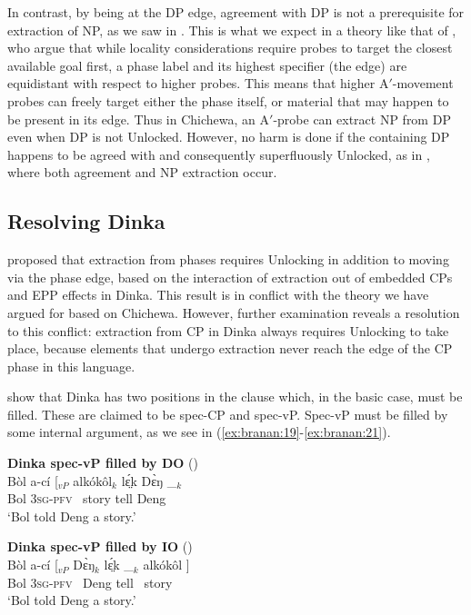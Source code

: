 \documentclass[output=paper,colorlinks,citecolor=brown]{langscibook}
\begin{document}
In contrast, by being at the DP edge, agreement with DP is not a prerequisite for extraction of NP, as we saw in . This is what we expect in a theory like that of \citet{RackowskiRichards2005}, who argue that while locality considerations require probes to target the closest available goal first, a phase label and its highest specifier (the edge) are equidistant with respect to higher probes. This means that higher A$'$-movement probes can freely target either the phase itself, or material that may happen to be present in its edge. Thus in Chichewa, an A$'$-probe can extract NP from DP even when DP is not Unlocked. However, no harm is done if the containing DP happens to be agreed with and consequently superfluously Unlocked, as in , where both agreement and NP extraction occur.

\subsection{Resolving Dinka}\label{sec:branan:5.2}

\citet{VanUrkRichards2015} proposed that extraction from phases requires Unlocking in addition to moving via the phase edge, based on the interaction of extraction out of embedded CPs and EPP effects in Dinka. This result is in conflict with the theory we have argued for based on Chichewa. However, further examination reveals a resolution to this conflict: extraction from CP in Dinka always requires Unlocking to take place, because elements that undergo extraction never reach the edge of the CP phase in this language.

\citeauthor{VanUrkRichards2015} show that Dinka has two positions in the clause which, in the basic case, must be filled. These are claimed to be spec-CP and spec-vP. Spec-vP must be filled by some internal argument, as we see in (\ref{ex:branan:19}-\ref{ex:branan:21}).

\ea%
    \label{ex:branan:19}
    \textbf{Dinka spec-vP filled by DO} \hfill{(\citealt[ex. 33b]{VanUrkRichards2015})}\\
    \gll    B\`{o}l a-c\'{i} [$_{vP}$ alk\'{o}k\^{o}l$_{k}$  lɛ̤́k  D\`{ɛ}ŋ \_$_{k}$ \\
            Bol \textsc{3sg-pfv} \,  story tell Deng \\
    \glt    `Bol told Deng a story.'
\z

\ea%
    \label{ex:branan:20}
    \textbf{Dinka spec-vP filled by IO} \hfill{(\citealt[ex. 33a]{VanUrkRichards2015})}\\
    \gll    B\`{o}l a-c\'{i} [$_{vP}$ D\`{ɛ}ŋ$_{k}$ lɛ̤́k \_$_{k}$ alk\'{o}k\^{o}l ] \\
            Bol \textsc{3sg-pfv} \,  Deng tell \,  story \\
    \glt    `Bol told Deng a story.'
\z
\end{document}
